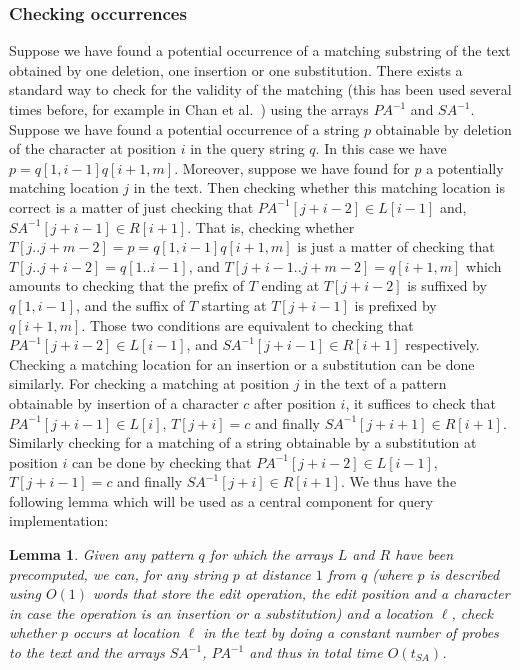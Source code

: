 \documentclass{article}
\newcommand{\?}{\mskip1.5mu}
\newtheorem{lemma}{Lemma}
\begin{document}
\subsubsection{Checking occurrences}
Suppose we have found a potential occurrence of a matching substring of the text obtained by one deletion, one insertion or one substitution. There exists a standard way to check for the validity of the matching (this has been used several times before, for example in Chan et al.~\cite{CLSTW10}) using the arrays $PA^{-1}$ and $SA^{-1}$. Suppose we have found a potential occurrence of a string $p$ obtainable by deletion of the character at position $i$ in the query string $q$. In this case  we have $p=q[1,i-1]q[i+1,m]$. Moreover, suppose we have found for $p$ a potentially matching location $j$ in the text. Then checking whether this matching location is correct is a matter of just checking that $PA^{-1}[j+i-2]\in L[i-1]$ and, $SA^{-1}[j+i-1]\in R[i+1]$. That is, checking whether $T[j..j+m-2]=p=q[1,i-1]q[i+1,m]$ is just a matter of checking that $T[j..j+i-2]=q[1..i-1]$, and $T[j+i-1..j+m-2]=q[i+1,m]$ which amounts to checking that the prefix of $T$ ending at $T[j+i-2]$ is suffixed by $q[1,i-1]$, and the suffix of $T$ starting at $T[j+i-1]$ is prefixed by $q[i+1,m]$. Those two conditions are equivalent to checking that $PA^{-1}[j+i-2]\in L[i-1]$, and $SA^{-1}[j+i-1]\in R[i+1]$ respectively. Checking a matching location for an insertion or a substitution can be done similarly. For checking a matching at position $j$ in the text of a pattern obtainable by insertion of a character $c$ after position $i$, it suffices to check that $PA^{-1}[j+i-1]\in L[i]$, $T[j+i]=c$ and finally $SA^{-1}[j+i+1]\in R[i+1]$. Similarly checking for a matching of a string obtainable by a substitution at position $i$ can be done by checking that $PA^{-1}[j+i-2]\in L[i-1]$, $T[j+i-1]=c$ and finally $SA^{-1}[j+i]\in R[i+1]$. 
We thus have the following lemma which will be used as a central component for query implementation:
\begin{lemma}
\label{check_occ_lemma}
Given any pattern $q$ for which the arrays $L$ and $R$ have been precomputed, we can, for any string $p$ at distance $1$ from $q$ (where $p$ is described using $O(1)$ words that store the edit operation, the edit position and a character in case the operation is an insertion or a substitution) and a location $\ell$, check whether $p$ occurs at location $\ell$ in the text by doing a constant number of probes to the text and the arrays $SA^{-1}$, $PA^{-1}$  and thus in total time $O(t_{SA})$. 
\end{lemma}
\end{document}
